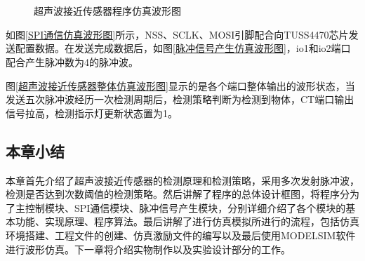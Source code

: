 \begin{figure}[ht]
	\centering
	\\
	\centering
	\\
	
	\caption{超声波接近传感器程序仿真波形图}
	\label{超声波接近传感器程序仿真波形图}
\end{figure}


如图\ref{SPI通信仿真波形图}所示，NSS、SCLK、MOSI引脚配合向TUSS4470芯片发送配置数据。在发送完成数据后，如图\ref{脉冲信号产生仿真波形图}，io1和io2端口配合产生脉冲数为4的脉冲波。\par
图\ref{超声波接近传感器整体仿真波形图}显示的是各个端口整体输出的波形状态，当发送五次脉冲波经历一次检测周期后，检测策略判断为检测到物体，CT端口输出信号拉高，检测指示灯更新状态置为1。\par
\subsection{本章小结}
本章首先介绍了超声波接近传感器的检测原理和检测策略，采用多次发射脉冲波，检测是否达到次数阈值的检测策略。然后讲解了程序的总体设计框图，将程序分为了主控制模块、SPI通信模块、脉冲信号产生模块，分别详细介绍了各个模块的基本功能、实现原理、程序算法。最后讲解了进行仿真模拟所进行的流程，包括仿真环境搭建、工程文件的创建、仿真激励文件的编写以及最后使用MODELSIM软件进行波形仿真。下一章将介绍实物制作以及实验设计部分的工作。
